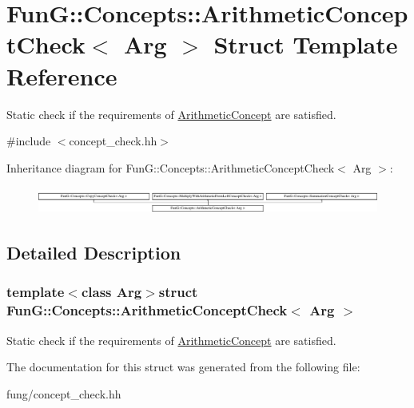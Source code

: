 \hypertarget{structFunG_1_1Concepts_1_1ArithmeticConceptCheck}{\section{Fun\-G\-:\-:Concepts\-:\-:Arithmetic\-Concept\-Check$<$ Arg $>$ Struct Template Reference}
\label{structFunG_1_1Concepts_1_1ArithmeticConceptCheck}
}


Static check if the requirements of \hyperlink{structFunG_1_1Concepts_1_1ArithmeticConcept}{Arithmetic\-Concept} are satisfied.  




{\ttfamily \#include $<$concept\-\_\-check.\-hh$>$}

Inheritance diagram for Fun\-G\-:\-:Concepts\-:\-:Arithmetic\-Concept\-Check$<$ Arg $>$\-:\begin{figure}[H]
\begin{center}
\leavevmode
\includegraphics[height=0.893142cm]{structFunG_1_1Concepts_1_1ArithmeticConceptCheck}
\end{center}
\end{figure}


\subsection{Detailed Description}
\subsubsection*{template$<$class Arg$>$struct Fun\-G\-::\-Concepts\-::\-Arithmetic\-Concept\-Check$<$ Arg $>$}

Static check if the requirements of \hyperlink{structFunG_1_1Concepts_1_1ArithmeticConcept}{Arithmetic\-Concept} are satisfied. 

The documentation for this struct was generated from the following file\-:\begin{DoxyCompactItemize}
\item 
fung/concept\-\_\-check.\-hh\end{DoxyCompactItemize}
